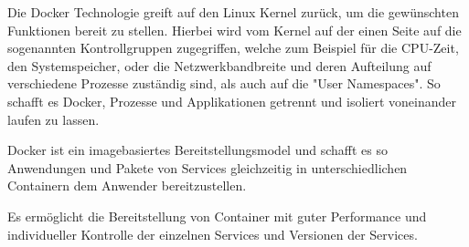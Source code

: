 \label{sec:dockerexplained}

Die Docker Technologie greift auf den Linux Kernel zurück, um die gewünschten Funktionen bereit zu stellen. Hierbei wird vom Kernel auf der einen Seite auf die sogenannten Kontrollgruppen zugegriffen, welche zum Beispiel für die CPU-Zeit, den Systemspeicher, oder die Netzwerkbandbreite und deren Aufteilung auf verschiedene Prozesse zuständig sind, als auch auf die "User Namespaces". So schafft es Docker, Prozesse und Applikationen getrennt und isoliert voneinander laufen zu lassen. \cite{Kontrollgruppen} \cite{DockerGrundlagen}

Docker ist ein imagebasiertes Bereitstellungsmodel und schafft es so Anwendungen und Pakete von Services gleichzeitig in unterschiedlichen Containern dem Anwender bereitzustellen. \cite{DockerGrundlagen}

Es ermöglicht die Bereitstellung von Container mit guter Performance und individueller Kontrolle der einzelnen Services und Versionen der Services. \cite{DockerGrundlagen}